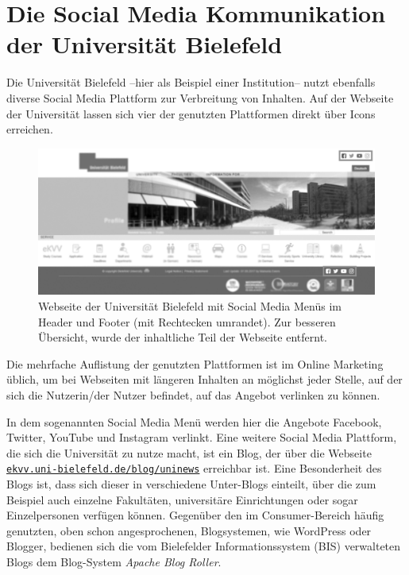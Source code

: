 \section{Die Social Media Kommunikation der Universität Bielefeld}

Die Universität Bielefeld --hier als Beispiel einer Institution-- nutzt ebenfalls diverse Social Media Plattform zur Verbreitung von Inhalten. Auf der Webseite der Universität lassen sich vier der genutzten Plattformen direkt über Icons erreichen.

\begin{figure}[h]
    \centering
    \includegraphics[width=\textwidth]{img/uni-smp-bw.png}
    \caption{Webseite der Universität Bielefeld mit Social Media Menüs im Header und Footer (mit Rechtecken umrandet). Zur besseren Übersicht, wurde der inhaltliche Teil der Webseite entfernt.}
    \label{fig:socialmediatoolsuni}
\end{figure}

Die mehrfache Auflistung der genutzten Plattformen ist im Online Marketing üblich, um bei Webseiten mit längeren Inhalten an möglichst jeder Stelle, auf der sich die Nutzerin/der Nutzer befindet, auf das Angebot verlinken zu können.

In dem sogenannten Social Media Menü werden hier die Angebote Facebook, Twitter, YouTube und Instagram verlinkt. Eine weitere Social Media Plattform, die sich die Universität zu nutze macht, ist ein Blog, der über die Webseite \texttt{\href{http://ekvv.uni-bielefeld.de/blog/uninews/}{ekvv.uni-bielefeld.de/blog/uninews}} erreichbar ist. Eine Besonderheit des Blogs ist, dass sich dieser in verschiedene Unter-Blogs einteilt, über die zum Beispiel auch einzelne Fakultäten, universitäre Einrichtungen oder sogar Einzelpersonen verfügen können. Gegenüber den im Consumer-Bereich häufig genutzten, oben schon angesprochenen, Blogsystemen, wie WordPress oder Blogger, bedienen sich die vom Bielefelder Informationssystem (BIS) verwalteten Blogs dem Blog-System \textit{Apache Blog Roller}.

